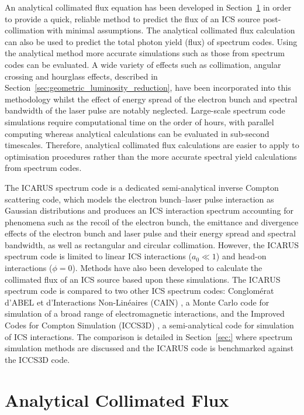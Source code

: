 \documentclass[../main.tex]{subfiles}
\begin{document}
An analytical collimated flux equation has been developed in Section~\ref{sec:analytical_collimated_flux} in order to provide a quick, reliable method to predict the flux of an ICS source post-collimation with minimal assumptions. The analytical collimated flux calculation can also be used to predict the total photon yield (flux) of spectrum codes. Using the analytical method more accurate simulations such as those from spectrum codes can be evaluated. A wide variety of effects such as collimation, angular crossing and hourglass effects, described in Section~\ref{sec:geometric_luminosity_reduction}, have been incorporated into this methodology whilst the effect of energy spread of the electron bunch and spectral bandwidth of the laser pulse are notably neglected. Large-scale spectrum code simulations require computational time on the order of hours, with parallel computing whereas analytical calculations can be evaluated in sub-second timescales. Therefore, analytical collimated flux calculations are easier to apply to optimisation procedures rather than the more accurate spectral yield calculations from spectrum codes.   

The \textsc{ICARUS} spectrum code is a dedicated semi-analytical inverse Compton scattering code, which models the electron bunch--laser pulse interaction as Gaussian distributions and produces an ICS interaction spectrum
accounting for phenomena such as the recoil of the electron bunch, the emittance and divergence effects of the electron bunch and laser pulse and their energy spread and spectral bandwidth, as well as rectangular and circular collimation. However, the \textsc{ICARUS} spectrum code is limited to linear ICS interactions ($a_{0} \ll 1$) and head-on interactions ($\phi=0$). Methods have also been developed to calculate the collimated flux of an ICS source based upon these simulations. The \textsc{ICARUS} spectrum code is compared to two other ICS spectrum codes: Conglom\'{e}rat d'ABEL et d'Interactions Non-Lin\'{e}aires (\textsc{CAIN}) \cite{chen1995cain}, a Monte Carlo code for simulation of a broad range of electromagnetic interactions, and the Improved Codes for Compton Simulation (\textsc{ICCS3D}) \cite{krafft2016laser,ranjan2018simulation}, a semi-analytical code for simulation of ICS interactions. The comparison is detailed in Section~\ref{sec:} where spectrum simulation methods are discussed and the \textsc{ICARUS} code is benchmarked against the \textsc{ICCS3D} code.

\section{Analytical Collimated Flux}
\label{sec:analytical_collimated_flux}
\end{document}
